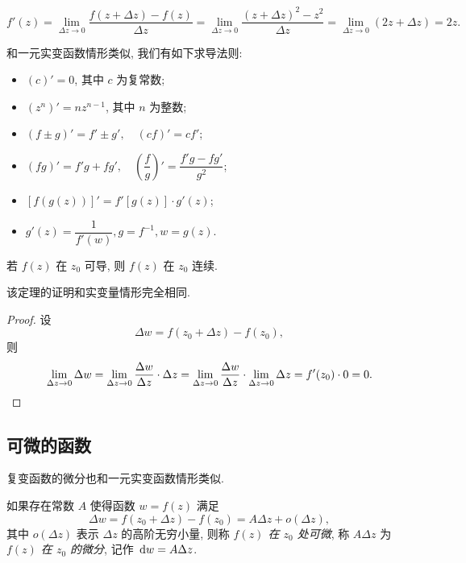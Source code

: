 \begin{solution}
	\[
	f'(z)=\lim_{\Delta z\to 0}\frac{f(z+\Delta z)-f(z)}{\Delta z}
	{=\lim_{\Delta z\to 0}\frac{(z+\Delta z)^2-z^2}{\Delta z}}
	{=\lim_{\Delta z\to 0}(2z+\Delta z)=2z.}
	\]
\end{solution}

和一元实变函数情形类似, 我们有如下求导法则:
\begin{theorem}[导函数的运算法则]
	\begin{itemize}
		\item $(c)'=0$, 其中 $c$ 为复常数;
		\item $(z^n)'=nz^{n-1}$, 其中 $n$ 为整数;
		\item $(f\pm g)'=f'\pm g',\quad (cf)'=cf'$;
		\item $(fg)'=f'g+fg',\quad \left(\dfrac fg\right)'=\dfrac{f'g-fg'}{g^2}$;
		\item $[f(g(z))]'=f'[g(z)]\cdot g'(z)$;
		\item $g'(z)=\dfrac1{f'(w)}, g=f^{-1}, w=g(z)$.
	\end{itemize}
\end{theorem}

\begin{theorem}[可导蕴含连续]
	若 $f(z)$ 在 $z_0$ 可导, 则 $f(z)$ 在 $z_0$ 连续.
\end{theorem}

该定理的证明和实变量情形完全相同.
\begin{proof}
	设
    \[\Delta w=f(z_0+\Delta z)-f(z_0),\]
  则
		\[
      \lim_{\Delta z\to 0}\Delta w
      =\lim_{\Delta z\to 0}\frac{\Delta w}{\Delta z}\cdot\Delta z
      =\lim_{\Delta z\to 0}\frac{\Delta w}{\Delta z}\cdot
        \lim_{\Delta z\to 0}\Delta z
      =f'(z_0)\cdot 0=0.\qedhere
		\]
\end{proof}


\subsection{可微的函数}

复变函数的微分也和一元实变函数情形类似.

\begin{definition}[微分]
	如果存在常数 $A$ 使得函数 $w=f(z)$ 满足
    \[\Delta w=f(z_0+\Delta z)-f(z_0)=A\Delta z+o(\Delta z),\]
	其中 $o(\Delta z)$ 表示 $\Delta z$ 的高阶无穷小量,
	则称 \emph{$f(z)$ 在 $z_0$ 处可微}, 称 $A\Delta z$ 为 \emph{$f(z)$ 在 $z_0$ 的微分}, 记作 $\,\mathrm{d} w=A \Delta z$.
\end{definition}

